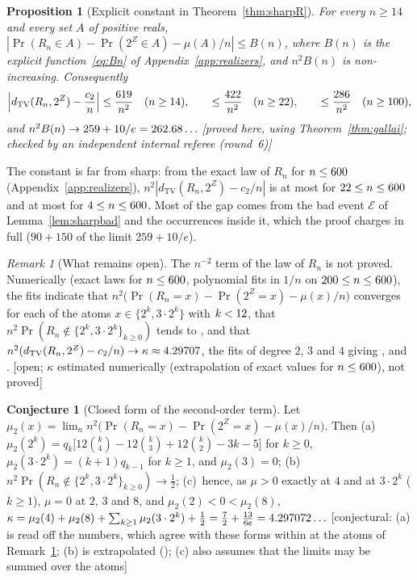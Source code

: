 \documentclass[11pt,a4paper]{article}
\theoremstyle{plain}
\newtheorem{proposition}[theorem]{Proposition}
\theoremstyle{definition}
\newtheorem{conjecture}[theorem]{Conjecture}
\theoremstyle{remark}
\newtheorem{remark}[theorem]{Remark}
\newcommand{\status}[1]{\textsf{\small [#1]}}
\begin{document}
\begin{proposition}[Explicit constant in Theorem~\ref{thm:sharpR}]\label{prop:sharpC}
For every $n\ge14$ and every set $A$ of positive reals, $|\Pr(R_n\in A)-\Pr(2^Z\in A)-\mu(A)/n|\le B(n)$, where $B(n)$ is the explicit function~\eqref{eq:Bn} of Appendix~\ref{app:realizers}, and $n^2B(n)$ is non-increasing. Consequently
\[
\Bigl|d_{\mathrm{TV}}(R_n,2^Z)-\frac{c_2}{n}\Bigr|\le\frac{619}{n^2}\quad(n\ge14),\qquad\le\frac{422}{n^2}\quad(n\ge22),\qquad\le\frac{286}{n^2}\quad(n\ge100),
\]
and $n^2B(n)\to259+10/e=262.68\ldots$ \status{proved here, using Theorem~\ref{thm:gallai}; checked by an independent internal referee (round~6)}
\end{proposition}

\noindent The constant is far from sharp: from the exact law of $R_n$ for $n\le600$ (Appendix~\ref{app:realizers}), $n^2|d_{\mathrm{TV}}(R_n,2^Z)-c_2/n|$ is at most \SecDtvMaxTT{} for $22\le n\le600$ and at most \SecDtvMaxAll{} for $4\le n\le600$. Most of the gap comes from the bad event $\mathcal E$ of Lemma~\ref{lem:sharpbad} and the occurrences inside it, which the proof charges in full ($90+150$ of the limit $259+10/e$).

\begin{remark}[What remains open]\label{rem:secondopen}
The $n^{-2}$ term of the law of $R_n$ is not proved. Numerically (exact laws for $n\le600$, polynomial fits in $1/n$ on $200\le n\le600$), the fits indicate that $n^2\bigl(\Pr(R_n=x)-\Pr(2^Z=x)-\mu(x)/n\bigr)$ converges for each of the \SecAtomsN{} atoms $x\in\{2^k,3\cdot2^k\}$ with $k<12$, that $n^2\Pr(R_n\notin\{2^k,3\cdot2^k\}_{k\ge0})$ tends to \SecUntracked, and that $n^2(d_{\mathrm{TV}}(R_n,2^Z)-c_2/n)\to\kappa\approx4.29707$, the fits of degree $2$, $3$ and $4$ giving \SecKappaTwo, \SecKappaThree{} and \SecKappaFour. \status{open; $\kappa$ estimated numerically (extrapolation of exact values for $n\le600$), not proved}
\end{remark}

\begin{conjecture}[Closed form of the second-order term]\label{conj:kappa}
Let $\mu_2(x)=\lim_n n^2\bigl(\Pr(R_n=x)-\Pr(2^Z=x)-\mu(x)/n\bigr)$. Then
(a)~$\mu_2(2^k)=q_k\bigl[12\binom k4-12\binom k3+12\binom k2-3k-5\bigr]$ for $k\ge0$, $\mu_2(3\cdot2^k)=(k+1)q_{k-1}$ for $k\ge1$, and $\mu_2(3)=0$;
(b)~$n^2\Pr(R_n\notin\{2^k,3\cdot2^k\}_{k\ge0})\to\tfrac12$;
(c)~hence, as $\mu>0$ exactly at $4$ and at $3\cdot2^k$ ($k\ge1$), $\mu=0$ at $2$, $3$ and $8$, and $\mu_2(2)<0<\mu_2(8)$, $\kappa=\mu_2(4)+\mu_2(8)+\sum_{k\ge1}\mu_2(3\cdot2^k)+\tfrac12=\tfrac72+\tfrac{13}{6e}=4.297072\ldots$ \status{conjectural: (a) is read off the numbers, which agree with these forms within \SecMuTwoDev{} at the \SecAtomsN{} atoms of Remark~\ref{rem:secondopen}; (b) is extrapolated (\SecUntracked); (c) also assumes that the limits may be summed over the atoms}
\end{conjecture}
\end{document}
